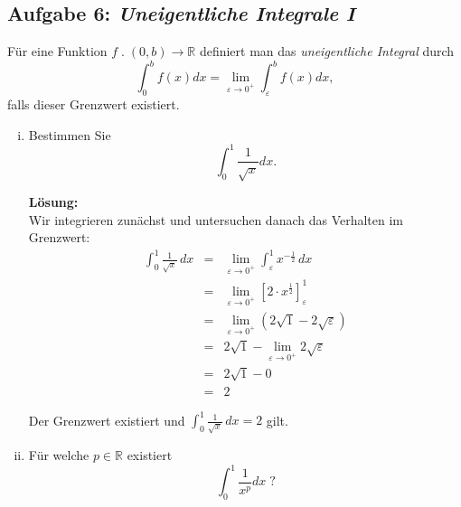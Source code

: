 \documentclass[11pt,a4paper,ngerman]{article}
\begin{document}

\subsection*{Aufgabe 6: \mdseries\itshape Uneigentliche Integrale I}

Für eine Funktion $f \; . \; (0,b) \rightarrow \mathbb{R}$ definiert man das \emph{uneigentliche Integral} durch
$$
\int_0^b f(x)dx = \lim_{\varepsilon \rightarrow 0^+} \int _\varepsilon^b f(x)dx,
$$
falls dieser Grenzwert existiert.
\begin{enumerate}[(i)]
	\item Bestimmen Sie
		$$
			\int_0^1 \frac{1}{\sqrt{x}} dx.
		$$

		\textbf{Lösung:}\\
		Wir integrieren zunächst und untersuchen danach das Verhalten im Grenzwert:
		$$\begin{array}{rcl}
			\int_0^1 \frac{1}{\sqrt{x}} \, dx &=& \underset{\varepsilon \rightarrow 0^+}{\lim} \int_\varepsilon^1 x^{-\frac{1}{2}} \, dx\\
				&=&\underset{\varepsilon \rightarrow 0^+}{\lim} \left[ 2 \cdot x^{\frac{1}{2}} \right]_\varepsilon^1\\
				&=& \underset{\varepsilon \rightarrow 0^+}{\lim} (2\sqrt{1} - 2\sqrt{\varepsilon})\\
				&=& 2 \sqrt{1} - \underset{\varepsilon \rightarrow 0^+}{\lim} 2 \sqrt{\varepsilon}\\
				&=& 2 \sqrt{1} - 0\\
				&=& 2
		\end{array}$$

		Der Grenzwert existiert und $\int_0^1 \frac{1}{\sqrt{x}} \, dx= 2$ gilt.
	\item Für welche $p \in \mathbb{R}$ existiert
		$$
			\int_0^1 \frac{1}{x^p}dx \; ?
		$$


\end{enumerate}
\end{document}
